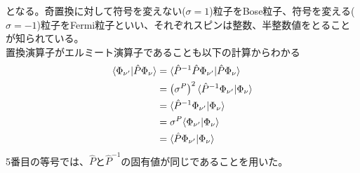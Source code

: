 \documentclass[dvipdfmx, 11pt, a4paper]{jsarticle}
\numberwithin{equation}{section}
\theoremstyle{definition}
\begin{document}
    となる。奇置換に対して符号を変えない($\sigma = 1$)粒子をBose粒子、符号を変える($\sigma = -1$)粒子をFermi粒子といい、それぞれスピンは整数、半整数値をとることが知られている。\\
    置換演算子がエルミート演算子であることも以下の計算からわかる
    \begin{align}
        \langle \Phi_{\nu'}|\hat{P} \Phi_\nu \rangle &= \langle \hat{P}^{-1} \hat{P}\Phi_{\nu'}|\hat{P}\Phi_\nu \rangle \notag \\
        &= \left( \sigma^{P} \right)^2 \langle \hat{P}^{-1}\Phi_{\nu'}| \Phi_\nu \rangle \notag \\
        &= \langle \hat{P}^{-1}\Phi_{\nu'}| \Phi_\nu \rangle \notag \\
        &= \sigma^P\langle \Phi_{\nu'}| \Phi_\nu \rangle \notag \\
        &= \langle \hat{P} \Phi_{\nu'}| \Phi_\nu \rangle \notag 
    \end{align}
    5番目の等号では、$\hat{P}$と$\hat{P}^{-1}$の固有値が同じであることを用いた。
\end{document}

